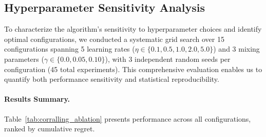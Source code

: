 
\subsection{Hyperparameter Sensitivity Analysis}
\label{sec:appendix_corralling_ablation}

To characterize the algorithm's sensitivity to hyperparameter choices and identify optimal configurations, we conducted a systematic grid search over 15 configurations spanning 5 learning rates ($\eta \in \{0.1, 0.5, 1.0, 2.0, 5.0\}$) and 3 mixing parameters ($\gamma \in \{0.0, 0.05, 0.10\}$), with 3 independent random seeds per configuration (45 total experiments).
This comprehensive evaluation enables us to quantify both performance sensitivity and statistical reproducibility.

\paragraph{Results Summary.}
Table~\ref{tab:corralling_ablation} presents performance across all configurations, ranked by cumulative regret.

